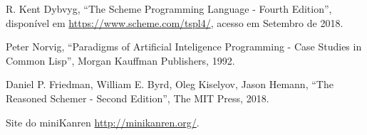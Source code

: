     
  \begin{thebibliography}{1}

   R. Kent Dybvyg,
    ``The Scheme Programming Language - Fourth Edition'',
    disponível em \url{https://www.scheme.com/tspl4/}, acesso em
    Setembro de 2018.

   Peter Norvig,
    ``Paradigms of Artificial Inteligence Programming - Case Studies
    in Common Lisp'',
    Morgan Kauffman Publishers, 1992.

     Daniel P. Friedman, William E. Byrd, Oleg Kiselyov,
      Jason Hemann,
      ``The Reasoned Schemer - Second Edition'',
      The MIT Press, 2018.

       Site do miniKanren \url{http://minikanren.org/}.
      
  \end{thebibliography}

%
